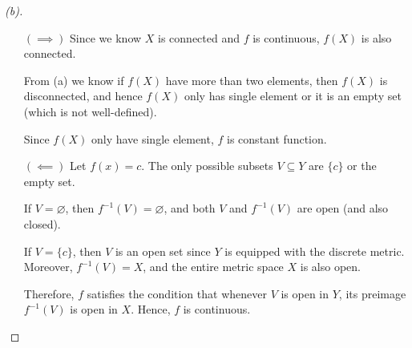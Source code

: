 \begin{proof}[(b)]
    \vphantom{text}
    \begin{itemize}
        \item [\((\implies )\)] Since we know $X$ is connected and $f$ is continuous, $f(X)$ is also connected.
        
        From (a) we know if $f(X)$ have more than two elements, then $f(X)$ is disconnected, and hence $f(X)$ only has single element or it is an empty set (which is not well-defined).
        
        Since $f(X)$ only have single element, $f$ is constant function.
        
        \item [\((\impliedby )\)] Let $f(x) = c$. The only possible subsets $V \subseteq Y$ are $\{c\}$ or the empty set.  

        If $V = \varnothing$, then $f^{-1}(V) = \varnothing$, and both $V$ and $f^{-1}(V)$ are open (and also closed).  
        
        If $V = \{c\}$, then $V$ is an open set since $Y$ is equipped with the discrete metric. Moreover, $f^{-1}(V) = X$, and the entire metric space $X$ is also open.  
        
        Therefore, $f$ satisfies the condition that whenever $V$ is open in $Y$, its preimage $f^{-1}(V)$ is open in $X$. Hence, $f$ is continuous.
    \end{itemize}
\end{proof}

